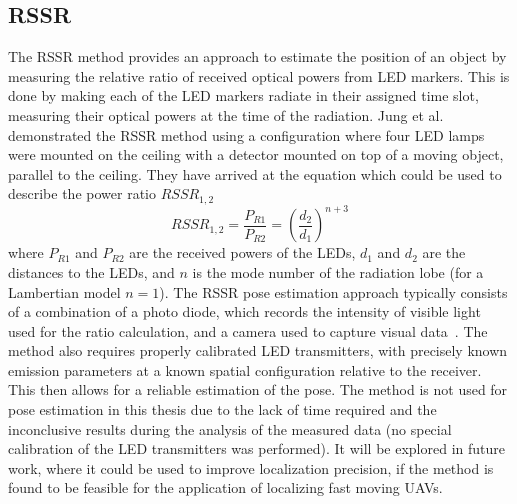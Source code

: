 \subsection{RSSR}

The \ac{RSSR} method provides an approach to estimate the position of an object by measuring the relative ratio of received optical powers from \ac{LED}
markers. This is done by making each of the \ac{LED} markers radiate in their assigned time slot, measuring their optical powers at the time of the
radiation. Jung et al.~\cite{sooyongrssr} demonstrated the \ac{RSSR} method using a configuration where four LED lamps were mounted on the ceiling
with a detector mounted on top of a moving object, parallel to the ceiling.
They have arrived at the equation  which could be used to describe the power ratio $RSSR_{1,2}$
\begin{equation}
RSSR_{1,2} = \frac{P_{R1}}{P_{R2}} = \left( \frac{d_2}{d_1} \right)^{n+3}
\label{eq:rssr}
\end{equation}
where $P_{R1}$ and $P_{R2}$ are the received powers of the \ac{LED}s, $d_1$ and $d_2$ are the distances to the \ac{LED}s, and $n$ is the mode number of the radiation lobe (for a Lambertian model $n = 1$).
The \ac{RSSR} pose estimation approach typically consists of a combination of a photo diode, which records the intensity of visible light used for the ratio
calculation, and a camera used to capture visual data~\cite{bai2020highcoveragecameraassisted}.
The method also requires properly calibrated \ac{LED} transmitters, with precisely known emission parameters at a known spatial configuration relative
to the receiver. This then allows for a reliable estimation of the pose.
The method is not used for pose estimation in this thesis due to the lack of time required and the inconclusive results during the analysis of
the measured data (no special calibration of the \ac{LED} transmitters was performed).
It will be explored in future work, where it could be used to improve localization precision, if the method is found to be feasible for the application
of localizing fast moving \ac{UAV}s.

